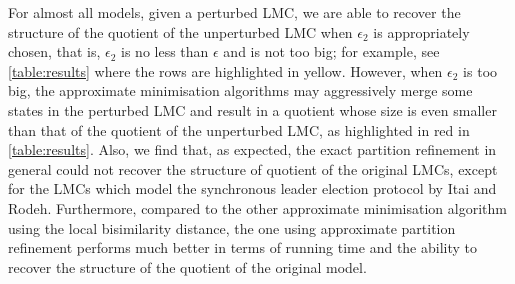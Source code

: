 \documentclass[a4paper,UKenglish,cleveref,autoref,thm-restate]{lipics-v2021}
\newcommand{\modify}[1]{{\color{black}#1}}
\begin{document}
For almost all models, given a perturbed LMC, we are able to recover the structure of the quotient of the unperturbed LMC when $\epsilon_2$ is appropriately chosen, that is, $\epsilon_2$ is no less than $\epsilon$ and is not too big; for example, see \cref{table:results} where the rows are highlighted in yellow. However, when $\epsilon_2$ is too big, the approximate minimisation algorithms may aggressively merge some states in the perturbed LMC and result in a quotient \modify{whose size is even smaller than that of the quotient of the unperturbed LMC}, as highlighted in red in \cref{table:results}. Also, we find that,  as expected, the exact partition refinement in general could not recover the structure of quotient of the original LMCs, except for the LMCs which model the synchronous leader election protocol by Itai and Rodeh. Furthermore, compared to the other approximate minimisation algorithm using the local bisimilarity distance, the one using approximate partition refinement performs much better in terms of running time and the ability to recover the structure of the quotient of the original model.

\end{document}
